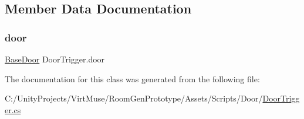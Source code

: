 \subsection{Member Data Documentation}
\mbox{\label{class_door_trigger_a592b30ac7c1c4b719d6a90fa96fbb046}} 
\subsubsection{\texorpdfstring{door}{door}}
{\footnotesize\ttfamily \mbox{\hyperlink{class_base_door}{Base\+Door}} Door\+Trigger.\+door\hspace{0.3cm}{\ttfamily [private]}}



The documentation for this class was generated from the following file\+:\begin{DoxyCompactItemize}
\item 
C\+:/\+Unity\+Projects/\+Virt\+Muse/\+Room\+Gen\+Prototype/\+Assets/\+Scripts/\+Door/\mbox{\hyperlink{_door_trigger_8cs}{Door\+Trigger.\+cs}}\end{DoxyCompactItemize}
